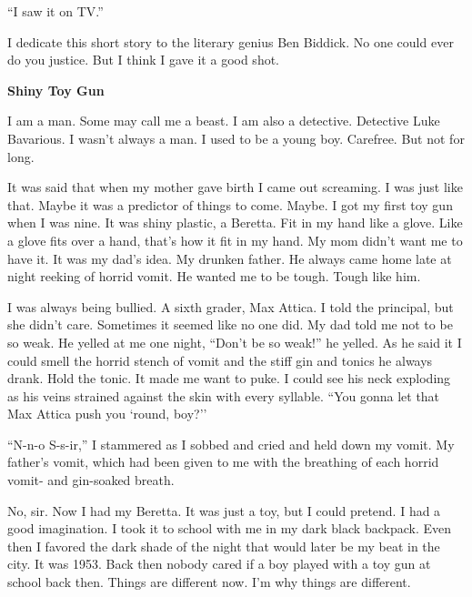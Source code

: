 ``I saw it on TV.'' 
 





I dedicate this short story to the literary genius Ben Biddick. No
one could ever do you justice. But I think I gave it a good
shot.



{\bf Shiny Toy Gun}



I am a man. Some may call me a beast. I am also a detective.
Detective Luke Bavarious. I wasn't always a man. I used to be
a young boy. Carefree. But not for long.



It was said that when my mother gave birth I came out screaming. I
was just like that. Maybe it was a predictor of things to come.
Maybe. I got my first toy gun when I was nine. It was shiny
plastic, a Beretta. Fit in my hand like a glove. Like a glove fits
over a hand, that's how it fit in my hand. My mom
didn't want me to have it. It was my dad's idea. My
drunken father. He always came home late at night reeking of horrid
vomit. He wanted me to be tough. Tough like him.



I was always being bullied. A sixth grader, Max Attica. I told the
principal, but she didn't care. Sometimes it seemed like no
one did. My dad told me not to be so weak. He yelled at me one
night, ``Don't be so weak!'' he yelled. As he said
it I could smell the horrid stench of vomit and the stiff gin and
tonics he always drank. Hold the tonic. It made me want to puke. I
could see his neck exploding as his veins strained against the skin
with every syllable. ``You gonna let that Max Attica push you
`round, boy?''



``N-n-o S-s-ir,'' I stammered as I sobbed and cried and
held down my vomit. My father's vomit, which had been given
to me with the breathing of each horrid vomit- and gin-soaked
breath.



No, sir. Now I had my Beretta. It was just a toy, but I could
pretend. I had a good imagination. I took it to school with me in
my dark black backpack. Even then I favored the dark shade of the
night that would later be my beat in the city. It was 1953. Back
then nobody cared if a boy played with a toy gun at school back
then. Things are different now. I'm why things are
different.



